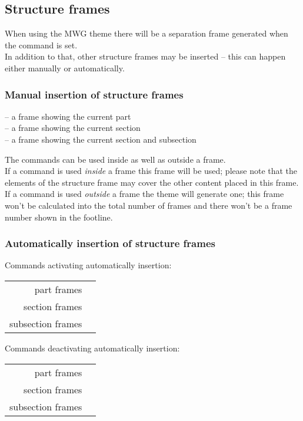 \documentclass[11pt]{ltxdoc}
\begin{document}
	
	\subsection{Structure frames}
	When using the MWG theme there will be a separation frame generated when the \texttt{\appendix} command is set. \\
	In addition to that, other structure frames may be inserted -- this can happen either manually or automatically.
	
	\subsubsection*{Manual insertion of structure frames}
	\texttt{\partframe} -- a frame showing the current part \\
	\texttt{\sectionframe} -- a frame showing the current section \\
	\texttt{\subsectionframe} -- a frame showing the current section and subsection
	
	\medskip
	The commands can be used inside as well as outside a frame. \\
	If a command is used \textit{inside} a frame this frame will be used; please note that the elements of the structure frame may cover the other content placed in this frame. \\
	If a command is used \textit{outside} a frame the theme will generate one; this frame won't be calculated into the total number of frames and there won't be a frame number shown in the footline.
	
	
	\subsubsection*{Automatically insertion of structure frames}
	Commands activating automatically insertion: \\[\smallskipamount]\nopagebreak
	\begin{tabular}{rl}
		part frames & \texttt{\activatepartframes} \\
		section frames & \texttt{\activatesectionframes} \\
		subsection frames & \texttt{\activatesubsectionframes}
	\end{tabular}
	
	\bigskip
	Commands deactivating automatically insertion: \\[\smallskipamount]\nopagebreak
	\begin{tabular}{rl}
		part frames & \texttt{\deactivatepartframes} \\
		section frames & \texttt{\deactivatesectionframes} \\
		subsection frames & \texttt{\deactivatesubsectionframes}
	\end{tabular}
	
\end{document}

